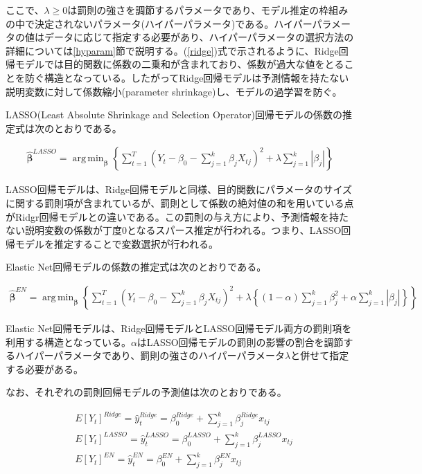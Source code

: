 \documentclass[a4paper, 12pt]{jsreport}
\DeclareMathOperator*{\argmin}{arg\,min}
\begin{document}
ここで、$\lambda \geq 0$は罰則の強さを調節するパラメータであり、モデル推定の枠組みの中で決定されないパラメータ(ハイパーパラメータ)である。ハイパーパラメータの値はデータに応じて指定する必要があり、ハイパーパラメータの選択方法の詳細については\ref{hyparam}節で説明する。(\ref{ridge})式で示されるように、Ridge回帰モデルでは目的関数に係数の二乗和が含まれており、係数が過大な値をとることを防ぐ構造となっている。したがってRidge回帰モデルは予測情報を持たない説明変数に対して係数縮小(parameter shrinkage)し、モデルの過学習を防ぐ。

LASSO(Least Absolute Shrinkage and Selection Operator)回帰モデルの係数の推定式は次のとおりである。

\begin{equation} \label{lasso}
  \begin{split}
    \hat{\bm{\beta}}^{LASSO} = \argmin_{\bm{\beta}}\left\{ \sum_{t=1}^{T} \left( Y_t - \beta_0 - \sum_{j=1}^{k} \beta_{j} X_{tj} \right)^2 + \lambda \sum_{j=1}^{k} \left|\beta_{j}\right| \right\}
  \end{split}
\end{equation}

LASSO回帰モデルは、Ridge回帰モデルと同様、目的関数にパラメータのサイズに関する罰則項が含まれているが、罰則として係数の絶対値の和を用いている点がRidgr回帰モデルとの違いである。この罰則の与え方により、予測情報を持たない説明変数の係数が丁度0となるスパース推定が行われる。つまり、LASSO回帰モデルを推定することで変数選択が行われる。

Elastic Net回帰モデルの係数の推定式は次のとおりである。

\begin{equation}
  \begin{split}
    \hat{\bm{\beta}}^{EN} = \argmin_{\bm{\beta}}\left\{ \sum_{t=1}^{T} \left( Y_t - \beta_0 - \sum_{j=1}^{k} \beta_{j} X_{tj} \right)^2 + 
    \lambda \left\{ 
      \left( 1 - \alpha \right) \sum_{j=1}^{k} \beta_{j}^2 + 
      \alpha \sum_{j=1}^{k} \left|\beta_{j}\right| 
      \right\} 
    \right\}
  \end{split}
\end{equation}

Elastic Net回帰モデルは、Ridge回帰モデルとLASSO回帰モデル両方の罰則項を利用する構造となっている。$\alpha$はLASSO回帰モデルの罰則の影響の割合を調節するハイパーパラメータであり、罰則の強さのハイパーパラメータ$\lambda$と併せて指定する必要がある。

なお、それぞれの罰則回帰モデルの予測値は次のとおりである。

\begin{equation}
  \begin{split}
    &E[Y_t]^{Ridge} = \hat{y}_t^{Ridge} = \beta_0^{Ridge} + \sum_{j=1}^{k} \beta_{j}^{Ridge} x_{tj} \\
    &E[Y_t]^{LASSO} = \hat{y}_t^{LASSO} = \beta_0^{LASSO} + \sum_{j=1}^{k} \beta_{j}^{LASSO} x_{tj} \\
    &E[Y_t]^{EN} = \hat{y}_t^{EN} = \beta_0^{EN} + \sum_{j=1}^{k} \beta_{j}^{EN} x_{tj} \\
  \end{split}
\end{equation}
\end{document}
